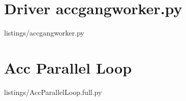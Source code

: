 \section{Driver accgangworker.py}

{listings/accgangworker.py} %


\section{Acc Parallel Loop}

{listings/AccParallelLoop.full.py} %
